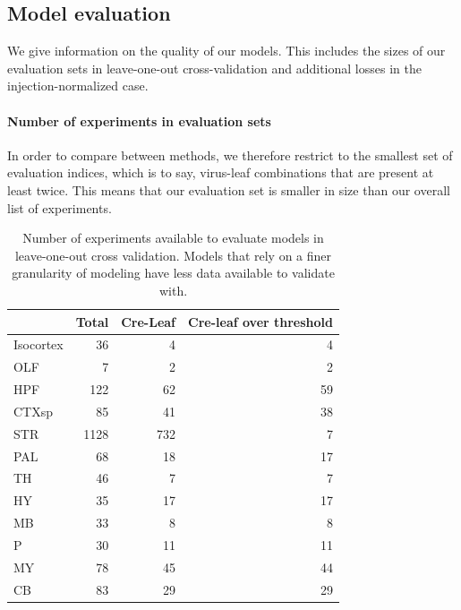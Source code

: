 \newpage

\subsection{Model evaluation}
\label{supp_sec:model-evaluation}

We give information on the quality of our models.
This includes the sizes of our evaluation sets in leave-one-out cross-validation and additional losses in the injection-normalized case.


\paragraph{Number of experiments in evaluation sets}

In order to compare between methods, we therefore restrict to the smallest set of evaluation indices, which is to say, virus-leaf combinations that are present at least twice. 
This means that our evaluation set is smaller in size than our overall list of experiments.


\begin{table}[H]
\small
\begin{tabular}{lrrr}
\toprule
{} &  Total &  Cre-Leaf & Cre-leaf over threshold \\
\midrule
Isocortex &     36 &         4  & 4\\
OLF       &      7 &         2 & 2\\
HPF       &    122 &        62 & 59\\
CTXsp     &     85 &        41 & 38\\
STR       &   1128 &       732& 7 \\
PAL       &     68 &        18 & 17\\
TH        &     46 &         7& 7 \\
HY        &     35 &        17& 17 \\
MB        &     33 &         8 & 8\\
P         &     30 &        11& 11\\
MY        &     78 &        45 & 44\\
CB        &     83 &        29& 29 \\
\bottomrule
\end{tabular}
\caption{Number of experiments available to evaluate models in leave-one-out cross validation. 
Models that rely on a finer granularity of modeling have less data available to validate with.} 
\label{tab:eval_size}
\end{table}

